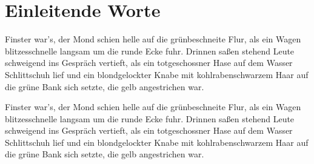 \chapter*{Einleitende Worte}
\label{chap:einleitende-worte}



%  

Finster war's, der Mond schien helle auf die grünbeschneite Flur, als
ein Wagen blitzesschnelle langsam um die runde Ecke fuhr. Drinnen
saßen stehend Leute schweigend ins Gespräch vertieft, als ein
totgeschossner Hase auf dem Wasser Schlittschuh lief und ein
blondgelockter Knabe mit kohlrabenschwarzem Haar auf die grüne Bank
sich setzte, die gelb angestrichen war.

Finster war's, der Mond schien helle auf die grünbeschneite Flur, als
ein Wagen blitzesschnelle langsam um die runde Ecke fuhr. Drinnen
saßen stehend Leute schweigend ins Gespräch vertieft, als ein
totgeschossner Hase auf dem Wasser Schlittschuh lief und ein
blondgelockter Knabe mit kohlrabenschwarzem Haar auf die grüne Bank
sich setzte, die gelb angestrichen war.
